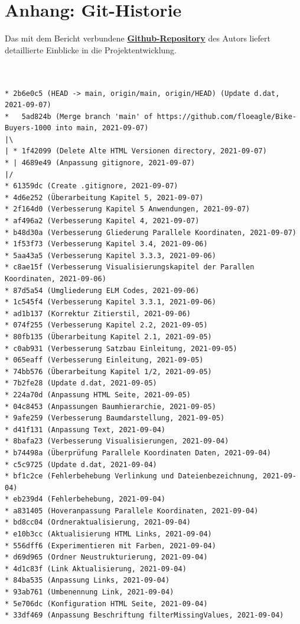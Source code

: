 \documentclass[usegeometry=true]{scrartcl}
\begin{document}
\newpage
\section*{Anhang: Git-Historie}
Das mit dem Bericht verbundene \href{https://github.com/floeagle/Bike-Buyers-1000}{\textbf{Github-Repository}} des Autors liefert detaillierte Einblicke in die Projektentwicklung. 
\begin{verbatim}


* 2b6e0c5 (HEAD -> main, origin/main, origin/HEAD) (Update d.dat, 2021-09-07)
*   5ad824b (Merge branch 'main' of https://github.com/floeagle/Bike-Buyers-1000 into main, 2021-09-07)
|\
| * 1f42099 (Delete Alte HTML Versionen directory, 2021-09-07)
* | 4689e49 (Anpassung gitignore, 2021-09-07)
|/
* 61359dc (Create .gitignore, 2021-09-07)
* 4d6e252 (Überarbeitung Kapitel 5, 2021-09-07)
* 2f164d0 (Verbesserung Kapitel 5 Anwendungen, 2021-09-07)
* af496a2 (Verbesserung Kapitel 4, 2021-09-07)
* b48d30a (Verbesserung Gliederung Parallele Koordinaten, 2021-09-07)
* 1f53f73 (Verbesserung Kapitel 3.4, 2021-09-06)
* 5aa43a5 (Verbesserung Kapitel 3.3.3, 2021-09-06)
* c8ae15f (Verbesserung Visualisierungskapitel der Parallen Koordinaten, 2021-09-06)
* 87d5a54 (Umgliederung ELM Codes, 2021-09-06)
* 1c545f4 (Verbesserung Kapitel 3.3.1, 2021-09-06)
* ad1b137 (Korrektur Zitierstil, 2021-09-06)
* 074f255 (Verbesserung Kapitel 2.2, 2021-09-05)
* 80fb135 (Überarbeitung Kapitel 2.1, 2021-09-05)
* c0ab931 (Verbesserung Satzbau Einleitung, 2021-09-05)
* 065eaff (Verbesserung Einleitung, 2021-09-05)
* 74bb576 (Überarbeitung Kapitel 1/2, 2021-09-05)
* 7b2fe28 (Update d.dat, 2021-09-05)
* 224a70d (Anpassung HTML Seite, 2021-09-05)
* 04c8453 (Anpassungen Baumhierarchie, 2021-09-05)
* 9afe259 (Verbesserung Baumdarstellung, 2021-09-05)
* d41f131 (Anpassung Text, 2021-09-04)
* 8bafa23 (Verbesserung Visualisierungen, 2021-09-04)
* b74498a (Überprüfung Parallele Koordinaten Daten, 2021-09-04)
* c5c9725 (Update d.dat, 2021-09-04)
* bf1c2ce (Fehlerbehebung Verlinkung und Dateienbezeichnung, 2021-09-04)
* eb239d4 (Fehlerbehebung, 2021-09-04)
* a831405 (Hoveranpassung Parallele Koordinaten, 2021-09-04)
* bd8cc04 (Ordneraktualisierung, 2021-09-04)
* e10b3cc (Aktualisierung HTML Links, 2021-09-04)
* 556dff6 (Experimentieren mit Farben, 2021-09-04)
* d69d965 (Ordner Neustrukturierung, 2021-09-04)
* 4d1c83f (Link Aktualisierung, 2021-09-04)
* 84ba535 (Anpassung Links, 2021-09-04)
* 93ab761 (Umbenennung Link, 2021-09-04)
* 5e706dc (Konfiguration HTML Seite, 2021-09-04)
* 33df469 (Anpassung Beschriftung filterMissingValues, 2021-09-04)

\end{verbatim}
\end{document}
